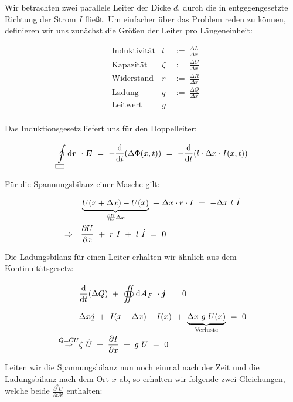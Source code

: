 Wir betrachten zwei parallele Leiter der Dicke $d$, durch die in entgegengesetzte Richtung der Strom $I$ fließt. Um einfacher über das Problem reden zu können, definieren wir uns zunächst die Größen der Leiter pro Längeneinheit:

\begin{align*}
&\text{Induktivität}  & l \ &:= \ \frac{\Delta L}{\Delta x}\\
&\text{Kapazität}   & \zeta  \ &:= \ \frac{\Delta C}{\Delta x}\\
&\text{Widerstand}   & r  \ &:= \ \frac{\Delta R}{\Delta x}\\
&\text{Ladung}   &q \ &:= \ \frac{\Delta Q}{\Delta x}\\
&\text{Leitwert}   &g   
\end{align*}
\ \\

Das Induktionsgesetz liefert uns für den Doppelleiter:

\begin{equation*}
\Oint{\rectangle}{}{\vec{r}}\cdot\vec{E} \ = \ - \diff{}{t} (\Delta\Phi(x,t))  \ = \ - \diff{}{t} (l \cdot \Delta x \cdot I(x,t))
\end{equation*}


Für die Spannungsbilanz einer Masche gilt:

\begin{align*}
& \underbrace{U(x+\Delta x) - U(x)}_{\pdiff{U}{x}\Delta x} \ + \ \Delta x \cdot r  \cdot I  \ = \ - \Delta x \ l \ \dot{I}\\
\Rightarrow\quad &\pdiff{U}{x} \ + \ r \ I \ + \ l \ \dot{I}  \ = \ 0
\end{align*}

Die Ladungsbilanz für einen Leiter erhalten wir ähnlich aus dem Kontinuitätsgesetz:

\begin{align*}
& \diff{}{t}(\Delta Q) \ + \ \Oiint{}{}{\vec{A}_F}\cdot\vec{j} \ = \ 0\\
& \Delta x \dot{q} \ + \ I(x+\Delta x)-I(x) \ + \ \underbrace{\Delta x \ g \ U(x)}_{\text{Verluste}} \ = \ 0\\
\overset{Q=CU}{\Rightarrow} & \zeta \ \dot{U} \ + \ \pdiff{I}{x} \ + \ g \ U  \ = \ 0
\end{align*}


Leiten wir die Spannungsbilanz nun noch einmal nach der Zeit und die  Ladungsbilanz nach dem Ort $x$ ab, so erhalten wir folgende zwei Gleichungen, welche beide $\frac{\partial^2 U}{\partial t \partial t}$ enthalten:

